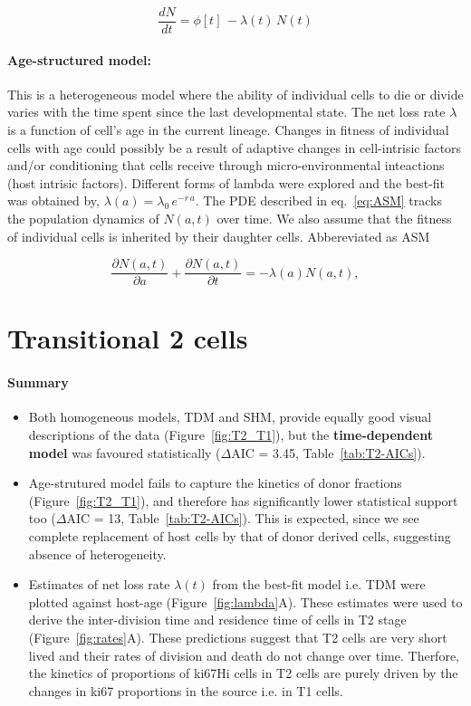 \documentclass[11pt]{article}
\newcommand{\be}{\begin{equation}}
\newcommand{\ee}{\end{equation}}
\begin{document}
\be
\frac{dN}{dt} = \phi[t] \, - \lambda(t) \, N(t)
\label{eq:TDM}
\ee


\paragraph*{Age-structured model:} 
This is a heterogeneous model where the ability of individual cells to die or divide varies with the time spent since the last developmental state. 
The net loss rate $\lambda$ is a function of cell's age in the current lineage. 
Changes in fitness of individual cells with age could possibly be a result of adaptive changes in cell-intrisic factors and/or conditioning that cells receive through micro-environmental inteactions (host intrisic factors).
Different forms of lambda were explored and the best-fit was obtained by, $\lambda(a) = \lambda_0 \, e^{-r \,a} $.
The PDE described in eq.~\ref{eq:ASM} tracks the population dynamics of $N(a,t)$ over time.
We also assume that the fitness of individual cells is inherited by their daughter cells.
Abbereviated as ASM

\be
\frac{\partial{N(a,t)}}{\partial{a}} + \frac{\partial{N(a,t)}}{\partial{t}} = - \lambda(a) N(a,t),
\label{eq:ASM}
\ee


\clearpage
\section*{Transitional 2 cells}

\paragraph{Summary}
\begin{itemize}
	\item Both homogeneous models, TDM and SHM, provide equally good visual descriptions of the data (Figure~\ref{fig:T2_T1}), but the \textbf{time-dependent model} was favoured statistically ($\Delta$AIC = 3.45, Table~\ref{tab:T2-AICs}).
	
	\item Age-strutured model fails to capture the kinetics of donor fractions (Figure~\ref{fig:T2_T1}), and therefore has significantly lower statistical support too ($\Delta$AIC = 13, Table~\ref{tab:T2-AICs}). This is expected, since we see complete replacement of host cells by that of donor derived cells, suggesting absence of heterogeneity.
	
	\item Estimates of net loss rate $\lambda(t)$ from the best-fit model i.e. TDM were plotted against host-age (Figure~\ref{fig:lambda}A). These estimates were used to derive the inter-division time and residence time of cells in T2 stage (Figure~\ref{fig:rates}A). These predictions suggest that T2 cells are very short lived and their rates of division and death do not change over time. Therfore, the kinetics of proportions of ki67Hi cells in T2 cells are purely driven by the changes in ki67 proportions in the source i.e. in T1 cells. 
	
\end{itemize}
\end{document}
